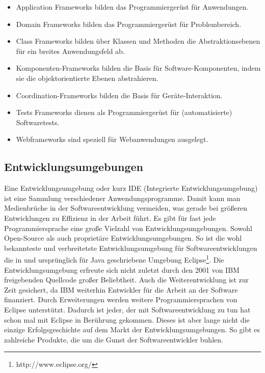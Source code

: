\begin{itemize}
  \item Application Frameworks 
        \newline bilden das Programmiergerüst für Anwendungen.
  \item Domain Frameworks 
        \newline bilden das Programmiergerüst für Problembereich.
  \item Class Frameworks 
        \newline bilden über Klassen und Methoden die Abstraktionsebenen 
        für ein breites Anwendungsfeld ab.
  \item Komponenten-Frameworks
        \newline bilden die Basis für Software-Komponenten, indem sie die 
        objektorientierte Ebenen abstrahieren.
  \item Coordination-Frameworks
        \newline bilden die Basis für Geräte-Interaktion.
  \item Tests Frameworks
        \newline dienen als Programmiergerüst für (automatisierte) Softwaretests.
  \item Webframeworks
        \newline sind speziell für Webanwendungen ausgelegt.
\end{itemize}

\subsection{Entwicklungsumgebungen}
Eine Entwicklungsumgebung oder kurz IDE (Integrierte Entwicklungsumgebung)
ist eine Sammlung verschiedener Anwendungsprogramme. Damit kann man 
Medienbrüche in der Softwareentwicklung vermeiden, was gerade bei größeren
Entwicklungen zu Effizienz in der Arbeit führt.
Es gibt für fast jede Programmiersprache eine große Vielzahl von 
Entwicklungsumgebungen. Sowohl Open-Source als auch proprietäre 
Entwicklungsumgebungen.
So ist die wohl bekannteste und verbreitetste Entwicklungsumgebung für
Softwareentwicklungen die in und ursprünglich für Java geschriebene 
Umgebung Eclipse\footnote{http://www.eclipse.org/}. Die Entwicklungsumgebung
erfreute sich nicht zuletzt durch den 2001 von IBM freigebenden Quellcode
großer Beliebtheit. Auch die Weiterentwicklung ist zur Zeit gesichert, 
da IBM weiterhin Entwickler für die Arbeit an der Software finanziert. 
Durch Erweiterungen werden weitere Programmiersprachen
von Eclipse unterstützt. Dadurch ist jeder, der mit Softwareentwicklung
zu tun hat schon mal mit Eclipse in Berührung gekommen.  
Dieses ist aber lange nicht die einzige Erfolgsgeschichte auf dem Markt
der Entwicklungsumgebungen. So gibt es zahlreiche Produkte, die um die 
Gunst der Softwareentwickler buhlen. 

